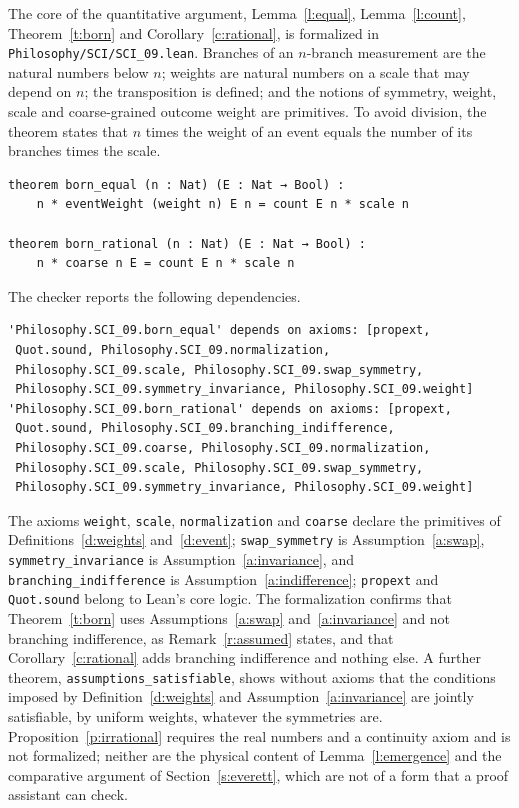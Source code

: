 \documentclass{situationist-preprint}
\begin{document}
The core of the quantitative argument, Lemma~\ref{l:equal}, Lemma~\ref{l:count}, Theorem~\ref{t:born} and Corollary~\ref{c:rational}, is formalized in \nolinkurl{Philosophy/SCI/SCI_09.lean}. Branches of an $n$-branch measurement are the natural numbers below $n$; weights are natural numbers on a scale that may depend on $n$; the transposition is defined; and the notions of symmetry, weight, scale and coarse-grained outcome weight are primitives. To avoid division, the theorem states that $n$ times the weight of an event equals the number of its branches times the scale.

\begin{lstlisting}
theorem born_equal (n : Nat) (E : Nat → Bool) :
    n * eventWeight (weight n) E n = count E n * scale n

theorem born_rational (n : Nat) (E : Nat → Bool) :
    n * coarse n E = count E n * scale n
\end{lstlisting}

The checker reports the following dependencies.

\begin{lstlisting}
'Philosophy.SCI_09.born_equal' depends on axioms: [propext,
 Quot.sound, Philosophy.SCI_09.normalization,
 Philosophy.SCI_09.scale, Philosophy.SCI_09.swap_symmetry,
 Philosophy.SCI_09.symmetry_invariance, Philosophy.SCI_09.weight]
'Philosophy.SCI_09.born_rational' depends on axioms: [propext,
 Quot.sound, Philosophy.SCI_09.branching_indifference,
 Philosophy.SCI_09.coarse, Philosophy.SCI_09.normalization,
 Philosophy.SCI_09.scale, Philosophy.SCI_09.swap_symmetry,
 Philosophy.SCI_09.symmetry_invariance, Philosophy.SCI_09.weight]
\end{lstlisting}

The axioms \texttt{weight}, \texttt{scale}, \texttt{normalization} and \texttt{coarse} declare the primitives of Definitions~\ref{d:weights} and~\ref{d:event}; \texttt{swap\_symmetry} is Assumption~\ref{a:swap}, \texttt{symmetry\_invariance} is Assumption~\ref{a:invariance}, and \texttt{branching\_indifference} is Assumption~\ref{a:indifference}; \texttt{propext} and \texttt{Quot.sound} belong to Lean's core logic. The formalization confirms that Theorem~\ref{t:born} uses Assumptions~\ref{a:swap} and~\ref{a:invariance} and not branching indifference, as Remark~\ref{r:assumed} states, and that Corollary~\ref{c:rational} adds branching indifference and nothing else. A further theorem, \texttt{assumptions\_satisfiable}, shows without axioms that the conditions imposed by Definition~\ref{d:weights} and Assumption~\ref{a:invariance} are jointly satisfiable, by uniform weights, whatever the symmetries are. Proposition~\ref{p:irrational} requires the real numbers and a continuity axiom and is not formalized; neither are the physical content of Lemma~\ref{l:emergence} and the comparative argument of Section~\ref{s:everett}, which are not of a form that a proof assistant can check.
\end{document}
